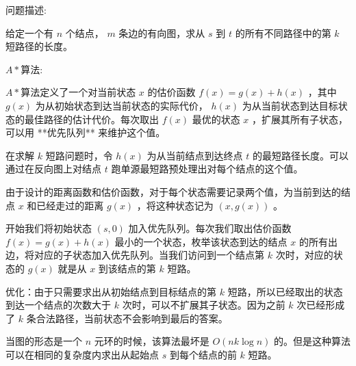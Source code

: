 问题描述:

给定一个有 $n$ 个结点， $m$ 条边的有向图，求从 $s$ 到 $t$ 的所有不同路径中的第 $k$ 短路径的长度。

$A*$算法:

$A*$算法定义了一个对当前状态 $x$ 的估价函数 $f(x)=g(x)+h(x)$ ，其中 $g(x)$ 为从初始状态到达当前状态的实际代价， $h(x)$ 为从当前状态到达目标状态的最佳路径的估计代价。每次取出 $f(x)$ 最优的状态 $x$ ，扩展其所有子状态，可以用 **优先队列** 来维护这个值。

在求解 $k$ 短路问题时，令 $h(x)$ 为从当前结点到达终点 $t$ 的最短路径长度。可以通过在反向图上对结点 $t$ 跑单源最短路预处理出对每个结点的这个值。

由于设计的距离函数和估价函数，对于每个状态需要记录两个值，为当前到达的结点 $x$ 和已经走过的距离 $g(x)$ ，将这种状态记为 $(x,g(x))$ 。

开始我们将初始状态 $(s,0)$ 加入优先队列。每次我们取出估价函数 $f(x)=g(x)+h(x)$ 最小的一个状态，枚举该状态到达的结点 $x$ 的所有出边，将对应的子状态加入优先队列。当我们访问到一个结点第 $k$ 次时，对应的状态的 $g(x)$ 就是从 $x$ 到该结点的第 $k$ 短路。

优化：由于只需要求出从初始结点到目标结点的第 $k$ 短路，所以已经取出的状态到达一个结点的次数大于 $k$ 次时，可以不扩展其子状态。因为之前 $k$ 次已经形成了 $k$ 条合法路径，当前状态不会影响到最后的答案。

当图的形态是一个 $n$ 元环的时候，该算法最坏是 $O(nk\log n)$ 的。但是这种算法可以在相同的复杂度内求出从起始点 $s$ 到每个结点的前 $k$ 短路。